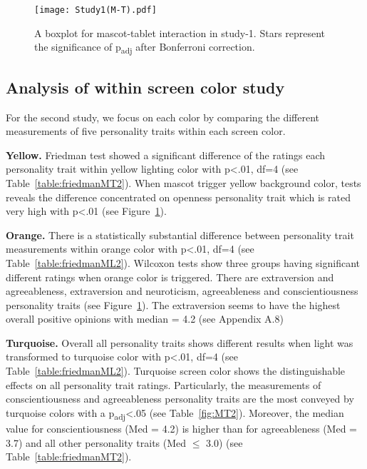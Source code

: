 \begin{figure}[H]
    \centering
    \texttt{[image: Study1(M-T).pdf]}
    \caption[]{A boxplot for mascot-tablet interaction in study-1.
    Stars represent the significance of p\textsubscript{adj} after Bonferroni correction.\footnotemark}
    \label{fig:MT1}
\end{figure}
\subsection{Analysis of within screen color study}
\label{subsec:MTstudy2}
For the second study, we focus on each color by comparing the different measurements of five
personality traits within each screen color.

\par\textbf{Yellow.}
Friedman test showed a significant difference of the ratings each personality trait
within yellow lighting color with p<.01, df=4 (see Table~\ref{table:friedmanMT2}).
When mascot trigger yellow background color, tests reveals the difference concentrated on openness
personality trait which is rated very high with p<.01 (see Figure~\ref{fig:MT1}).

\par\textbf{Orange.}
There is a statistically substantial difference between personality trait measurements within
orange color with p<.01, df=4 (see Table~\ref{table:friedmanML2}).
Wilcoxon tests show three groups having significant different ratings when orange
color is triggered.
There are extraversion and agreeableness, extraversion and neuroticism, agreeableness and
conscientiousness personality traits (see Figure~\ref{fig:MT1}).
The extraversion seems to have the highest overall positive opinions
with median = 4.2 (see Appendix A.8)

\par\textbf{Turquoise.}
Overall all personality traits shows different results when light was transformed to turquoise color
with p<.01, df=4 (see Table~\ref{table:friedmanML2}).
Turquoise screen color shows the distinguishable effects on all personality trait ratings.
Particularly, the measurements of conscientiousness and agreeableness personality traits are the most
conveyed by turquoise colors with a p\textsubscript{adj}<.05 (see Table~\ref{fig:MT2}).
Moreover, the median value for conscientiousness (Med = 4.2) is higher than for agreeableness
(Med = 3.7) and all other personality traits (Med $\leq$ 3.0) (see Table~\ref{table:friedmanMT2}).

